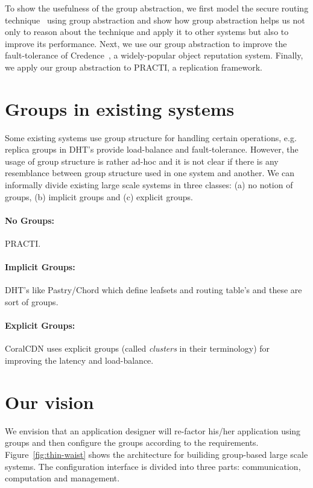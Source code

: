 To show the usefulness of the group abstraction, we first model the secure routing technique~\cite{} using group abstraction and show how group abstraction helps us not only to reason about the technique and apply it to other systems but also to improve its performance. Next, we use our group abstraction to improve the fault-tolerance of Credence~\cite{}, a widely-popular object reputation system. Finally, we apply our group abstraction to PRACTI, a replication framework.

\section{Groups in existing systems}
Some existing systems use group structure for handling certain operations, e.g. replica groups in DHT's provide load-balance and fault-tolerance. However, the usage of group structure is rather ad-hoc and it is not clear if there is any resemblance between group structure used in one system and another.
We can informally divide existing large scale systems in three classes: (a) no notion of groups, (b) implicit groups and (c) explicit groups.

\paragraph{No Groups:} PRACTI.

\paragraph{Implicit Groups:} DHT's like Pastry/Chord which define leafsets and routing table's and these are sort of groups.

\paragraph{Explicit Groups:} CoralCDN uses explicit groups (called \textit{clusters} in their terminology) for improving the latency and load-balance.


\section{Our vision}
We envision that an application designer will re-factor his/her application using groups and then configure the groups according to the requirements. Figure~\ref{fig:thin-waist} shows the architecture for builiding group-based large scale systems. The configuration interface is divided into three parts: communication, computation and management.


